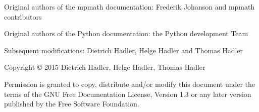 \small
\noindent 
Original authors of the mpmath documentation: Frederik Johanson and mpmath contributors

\noindent 
Original authors of the Python documentation: the Python development Team


\noindent 
Subsequent modifications: Dietrich Hadler, Helge Hadler and Thomas Hadler




\vspace{20cm}


 

%


\noindent
Copyright \copyright \hspace{0.5mm}  2015 Dietrich Hadler, Helge Hadler, Thomas Hadler

\vspace{1cm}

\noindent
Permission is granted to copy, distribute and/or modify this document under the terms of the GNU Free Documentation License, Version 1.3 or any later version published by the Free Software Foundation. 
\normalsize